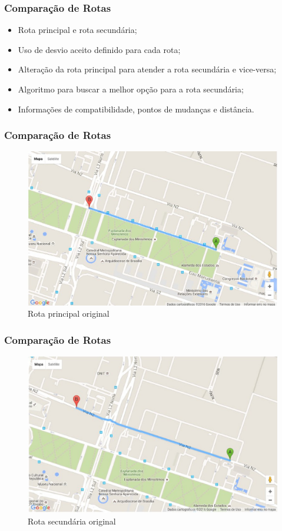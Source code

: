 \documentclass{beamer}
\begin{document}
\begin{frame}
\frametitle{Comparação de Rotas}

\begin{itemize}
	\item Rota principal e rota secundária;
	\item Uso de desvio aceito definido para cada rota;
	\item Alteração da rota principal para atender a rota secundária e vice-versa;
	\item Algoritmo para buscar a melhor opção para a rota secundária;
	\item Informações de compatibilidade, pontos de mudanças e distância.
\end{itemize}

\end{frame}

\begin{frame}
\frametitle{Comparação de Rotas}

\begin{figure}[h]
	\centering
	\includegraphics[scale=0.35]{figuras/rota1.eps}
	\caption{Rota principal original}
\end{figure}

\end{frame}

\begin{frame}
\frametitle{Comparação de Rotas}

\begin{figure}[h]
	\centering
	\includegraphics[scale=0.35]{figuras/rota2.eps}
	\caption{Rota secundária original}
\end{figure}

\end{frame}
\end{document}
